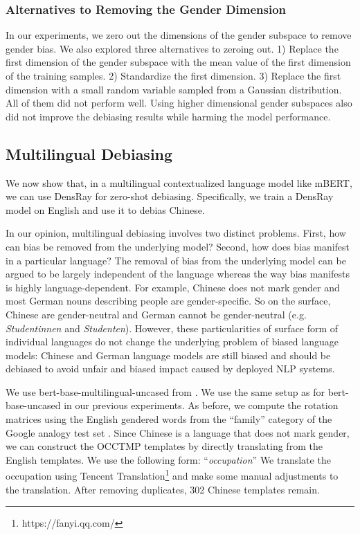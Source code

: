 \subsubsection*{Alternatives to Removing the Gender Dimension}
In our experiments, we zero out the dimensions of the gender
subspace to remove gender bias. 
We also explored three alternatives to zeroing out. 1)
Replace the first dimension of the gender subspace with the
mean value of the first dimension of the training
samples. 2) Standardize the first dimension. 3) Replace the
first dimension with a small random variable sampled from a Gaussian distribution. All of them did not perform well. Using higher dimensional gender subspaces also did not improve the debiasing results while harming the model performance.


\subsection{Multilingual Debiasing}
We now show that, in a multilingual contextualized language model like mBERT, we can use DensRay for zero-shot debiasing. Specifically, we train a DensRay model on English and use it to debias Chinese.

In our opinion, multilingual debiasing involves two distinct
	problems. First, how can bias be removed from the underlying
	model? Second, how does bias manifest in a particular
	language? The removal of bias from the underlying model can
	be argued to be largely independent of the language whereas
	the way bias manifests is highly language-dependent. For
	example, Chinese does not mark gender and most German nouns
	describing people are gender-specific. So on the surface,
	Chinese are gender-neutral and German
	cannot be gender-neutral (e.g. \textit{Studentinnen} and \textit{Studenten}). However, these particularities of surface form of individual
	languages do not change the underlying problem of biased
	language models: Chinese and German language models are
	still biased and should be debiased to avoid unfair and
	biased impact caused by deployed NLP systems.
	
We use  bert-base-multilingual-uncased from
\cite{wolf2019huggingfaces}. We use the same setup as for
bert-base-uncased in our previous experiments. As before, we
compute the rotation matrices using the English gendered
words from the ``family'' category of the Google analogy
test set \cite{mikolov2013efficient}. Since Chinese is a language that does not mark gender, we can construct the OCCTMP templates by directly translating from the English templates. We use the following form:
``\text{[MASK]}\textit{occupation}'' We translate the occupation using Tencent Translation\footnote{https://fanyi.qq.com/} and make some manual adjustments to the translation. After removing duplicates,  302 Chinese templates remain.

